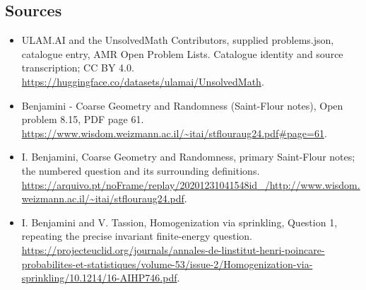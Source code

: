 \documentclass[11pt,a4paper]{article}
\begin{document}
\subsection{Sources}
\begin{itemize}
\item[S1] ULAM.AI and the UnsolvedMath Contributors, supplied problems.json, catalogue entry, AMR Open Problem Lists. Catalogue identity and source transcription; CC BY 4.0.
\url{https://huggingface.co/datasets/ulamai/UnsolvedMath}.
\item[S2] Benjamini - Coarse Geometry and Randomness (Saint-Flour notes), Open problem 8.15, PDF page 61. 
\url{https://www.wisdom.weizmann.ac.il/~itai/stflouraug24.pdf#page=61}.
\item[S3] I. Benjamini, Coarse Geometry and Randomness, primary Saint-Flour notes; the numbered question and its surrounding definitions.
\url{https://arquivo.pt/noFrame/replay/20201231041548id_/http://www.wisdom.weizmann.ac.il/~itai/stflouraug24.pdf}.
\item[S4] I. Benjamini and V. Tassion, Homogenization via sprinkling, Question 1, repeating the precise invariant finite-energy question.
\url{https://projecteuclid.org/journals/annales-de-linstitut-henri-poincare-probabilites-et-statistiques/volume-53/issue-2/Homogenization-via-sprinkling/10.1214/16-AIHP746.pdf}.
\end{itemize}
\end{document}
